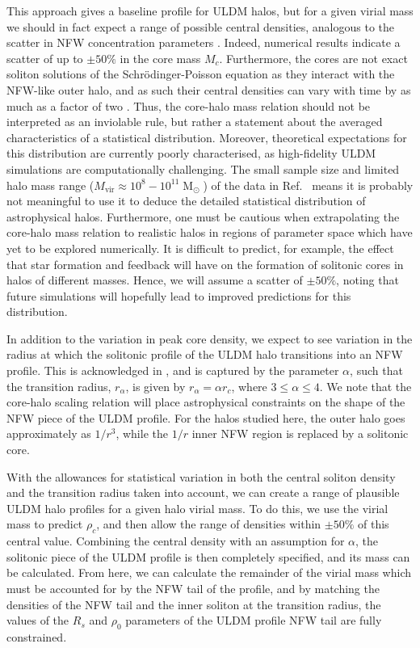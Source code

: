 \documentclass[a4paper,11pt]{article}
\begin{document}
This approach gives a baseline profile for ULDM halos, but for a given virial mass we should in fact expect a range of possible central densities, analogous to the scatter in NFW concentration parameters \cite{Maccio:2008pcd}. Indeed, numerical results \cite{Schive:2014hza} indicate a scatter of up to $\pm 50\%$ in the core mass $M_c$. Furthermore, the cores are not exact soliton solutions of the Schr\"{o}dinger-Poisson equation as they interact with the NFW-like outer halo, and as such their central densities can vary with time by as much as a factor of two \cite{Veltmaat:2018dfz}. Thus, the core-halo mass relation should not be interpreted as an inviolable rule, but rather a statement about the averaged characteristics of a statistical distribution. Moreover, theoretical expectations for this distribution are currently poorly characterised, as high-fidelity ULDM simulations are computationally challenging. The small sample size and limited halo mass range ($ M_{\mathrm{vir}} \approx 10^8-10^{11} \operatorname{M}_{\odot}$) of the data in Ref.~\cite{Schive:2014hza} means it is probably not meaningful to use it to deduce the detailed statistical distribution of astrophysical halos. Furthermore, one must be cautious when extrapolating the core-halo mass relation to realistic halos in regions of parameter space which have yet to be explored numerically. It is difficult to predict, for example, the effect that star formation and feedback will have on the formation of solitonic cores in halos of different masses. Hence, we will  assume a scatter of $\pm 50\%$, noting that future simulations will hopefully lead to improved predictions for this distribution. 

In addition to the variation in peak core density, we expect to see variation in the radius at which the solitonic profile of the ULDM halo transitions into an NFW profile. This is acknowledged in \cite{Robles:2018fur}, and is captured by the parameter $\alpha$, such that the transition radius, $r_{\alpha}$, is given by $r_{\alpha} = \alpha r_c$, where $3 \leq \alpha \leq 4$. We note that the core-halo scaling relation will place astrophysical constraints on the shape of the NFW piece of the ULDM profile. For the halos studied here, the outer halo goes approximately as $1/r^3$, while the $1/r$ inner NFW region is replaced by a solitonic core.


With the allowances for statistical variation in both the central soliton density and the transition radius taken into account, we can create a range of plausible ULDM halo profiles for a given halo virial mass. To do this, we use the virial mass to predict $\rho_c$, and then allow the range of densities within $\pm 50\% $ of this central value. Combining the central density with an assumption for $\alpha$, the solitonic piece of the ULDM profile is then completely specified, and its mass can be calculated. From here, we can calculate the remainder of the virial mass which must be accounted for by the NFW tail of the profile, and by matching the densities of the NFW tail and the inner soliton at the transition radius, the values of the $R_s$ and $\rho_0$ parameters of the ULDM profile NFW tail are fully constrained.  
\end{document}
